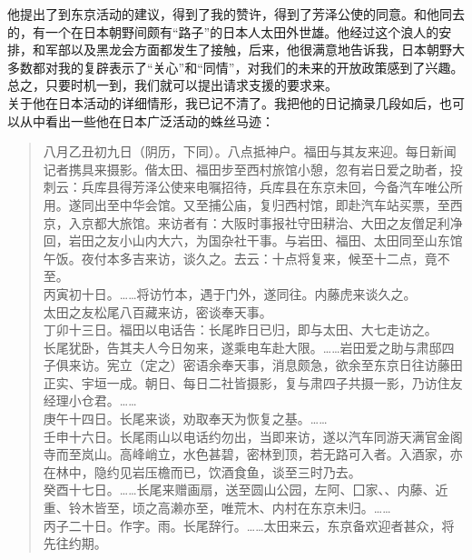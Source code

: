 他提出了到东京活动的建议，得到了我的赞许，得到了芳泽公使的同意。和他同去的，有一个在日本朝野间颇有“路子”的日本人太田外世雄。他经过这个浪人的安排，和军部以及黑龙会方面都发生了接触，后来，他很满意地告诉我，日本朝野大多数都对我的复辟表示了“关心”和“同情”，对我们的未来的开放政策感到了兴趣。总之，只要时机一到，我们就可以提出请求支援的要求来。\\

关于他在日本活动的详细情形，我已记不清了。我把他的日记摘录几段如后，也可以从中看出一些他在日本广泛活动的蛛丝马迹：\\

\begin{quote}
	八月乙丑初九日（阴历，下同）。八点抵神户。福田与其友来迎。每日新闻记者携具来摄影。偕太田、福田步至西村旅馆小憩，忽有岩日爱之助者，投刺云：兵库县得芳泽公使来电嘱招待，兵库县在东京未回，今备汽车唯公所用。遂同出至中华会馆。又至捕公庙，复归西村馆，即赴汽车站买票，至西京，入京都大旅馆。来访者有：大阪时事报社守田耕治、大田之友僧足利净回，岩田之友小山内大六，为国杂社干事。与岩田、福田、太田同至山东馆午饭。夜付本多吉来访，谈久之。去云：十点将复来，候至十二点，竟不至。\\

丙寅初十日。……将访竹本，遇于门外，遂同往。内藤虎来谈久之。\\

太田之友松尾八百藏来访，密谈奉天事。\\

丁卯十三日。福田以电话告：长尾昨日已归，即与太田、大七走访之。\\

长尾犹卧，告其夫人今日匆来，遂乘电车赴大限。……岩田爱之助与肃邸四子俱来访。宪立（定之）密语余奉天事，消息颇急，欲余至东京日往访藤田正实、宇垣一成。朝日、每日二社皆摄影，复与肃四子共摄一影，乃访住友经理小仓君。……\\

庚午十四日。长尾来谈，劝取奉天为恢复之基。……\\

壬申十六日。长尾雨山以电话约勿出，当即来访，遂以汽车同游天满官金阁寺而至岚山。高峰峭立，水色甚碧，密林到顶，若无路可入者。入酒家，亦在林中，隐约见岩压檐而已，饮酒食鱼，谈至三时乃去。\\

癸酉十七日。……长尾来赠画扇，送至圆山公园，左阿、囗家、、内藤、近重、铃木皆至，顷之高濑亦至，唯荒木、内村在东京未归。……\\

丙子二十日。作字。雨。长尾辞行。……太田来云，东京备欢迎者甚众，将先往约期。\\


\end{quote}
